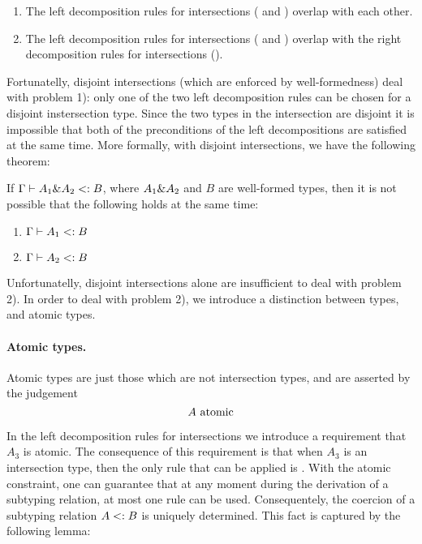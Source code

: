 \begin{enumerate}

\item The left decomposition rules for intersections ( and ) overlap with each other.

\item The left decomposition rules for intersections ( and )
overlap with the right decomposition rules for intersections ().

\end{enumerate}

\noindent Fortunatelly, disjoint intersections (which are enforced by well-formedness)
deal with problem 1): only one of the two left decomposition rules
can be chosen for a disjoint instersection type. Since the two types in the intersection
are disjoint it is impossible that both of the preconditions of the left decompositions are satisfied
at the same time. More formally, with disjoint intersections, we have the following theorem:

\begin{lemma}
  \label{lemma:unique-subtype-contributor}

  If $\Gamma \vdash A_1 \& A_2 <: B$, where $A_1 \& A_2$ and $B$ are well-formed types,
  then it is not possible that the following holds at the same time:
  \begin{enumerate}
    \item $\Gamma \vdash A_1 <: B$
    \item $\Gamma \vdash A_2 <: B$
  \end{enumerate}
\end{lemma}

Unfortunatelly, disjoint intersections alone are insufficient to deal with problem 2).
In order to deal with problem 2), we introduce a distinction between types, and atomic types.

\paragraph{Atomic types.} Atomic types are just those which are not intersection
types, and are asserted by the judgement \[ A \ \textnormal{atomic} \]

In the left decomposition rules for intersections we introduce a requirement that
$A_3$ is atomic. The consequence of this requirement is that when $A_3$ is an intersection type, then
the only rule that can be applied is .
With the atomic constraint, one can guarantee that at any moment during the
derivation of a subtyping relation, at most one rule can be used.
Consequentely, the coercion of a subtyping relation $A <: B$ is uniquely determined.
This fact is captured by the following lemma:

